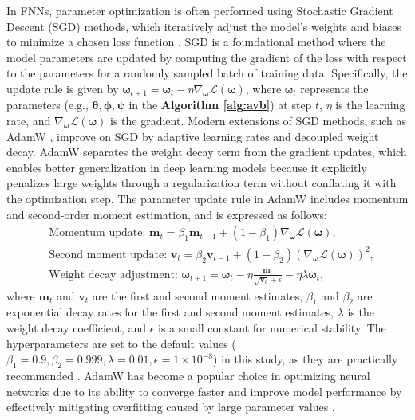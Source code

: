 \documentclass[a4paper,12pt]{article}
\theoremstyle{plain} %
\theoremstyle{remark} %
\theoremstyle{definition} %
\begin{document}
In FNNs, parameter optimization is often performed using Stochastic Gradient Descent (SGD) methods, which iteratively adjust the model’s weights and biases to minimize a chosen loss function \citep{lecun2015deep}. SGD is a foundational method where the model parameters are updated by computing the gradient of the loss with respect to the parameters for a randomly sampled batch of training data. Specifically, the update rule is given by $\bm{\omega}_{t+1} = \bm{\omega}_t - \eta \nabla_{\bm{\omega}} \mathcal{L}(\bm{\omega})$, where $\bm{\omega}_t$ represents the parameters (e.g., $\bm{\theta},\bm{\phi},\bm{\psi}$ in the \textbf{Algorithm \ref{alg:avb}}) at step $t$, $\eta$ is the learning rate, and $\nabla_{\bm{\omega}} \mathcal{L}(\bm{\omega})$ is the gradient. Modern extensions of SGD methods, such as AdamW \citep{loshchilov2017decoupled}, improve on SGD by adaptive learning rates and decoupled weight decay. AdamW separates the weight decay term from the gradient updates, which enables better generalization in deep learning models because it explicitly penalizes large weights through a regularization term without conflating it with the optimization step. The parameter update rule in AdamW includes momentum and second-order moment estimation, and is expressed as follows:
\begin{align}
    &\text{Momentum update: }\bm{m}_t = \beta_1 \bm{m}_{t-1} + (1 - \beta_1) \nabla_{\bm{\omega}}\mathcal{L}(\bm{\omega}),\\
    &\text{Second moment update: }\bm{v}_t = \beta_2 \bm{v}_{t-1} + (1 - \beta_2) (\nabla_{\bm{\omega}}\mathcal{L}(\bm{\omega}))^2,\\
    &\text{Weight decay adjustment: }\bm{\omega}_{t+1} = \bm{\omega}_t - \eta \frac{\bm{m}_t}{\sqrt{\bm{v}_t} + \epsilon} - \eta \lambda \bm{\omega}_t,
\end{align}
where $\bm{m}_t$ and $\bm{v}_t$ are the first and second moment estimates, $\beta_1$ and $\beta_2$ are exponential decay rates for the first and second moment estimates, $\lambda$ is the weight decay coefficient, and $\epsilon$ is a small constant for numerical stability. The hyperparameters are set to the default values ($\beta_1=0.9, \beta_2=0.999, \lambda=0.01, \epsilon=1\times10^{-8}$) in this study, as they are practically recommended \citep{loshchilov2017decoupled,reddi2019convergence}. AdamW has become a popular choice in optimizing neural networks due to its ability to converge faster and improve model performance by effectively mitigating overfitting caused by large parameter values \citep{zhuang2022understanding}.
\end{document}
